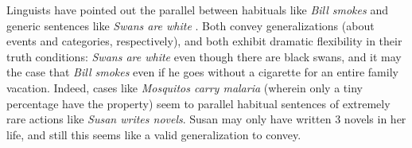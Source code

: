 \documentclass[10pt,letterpaper]{article}
\newcommand{\ndg}[1]{\textcolor{Green}{[ndg: #1]}}
\begin{document}


Linguists have pointed out the parallel between habituals like \emph{Bill smokes} and generic sentences like \emph{Swans are white} \cite{Carlson1977, Carlson2005, Cohen1999}.
Both convey generalizations (about events and categories, respectively), and both exhibit dramatic flexibility in their truth conditions: \emph{Swans are white} even though there are black swans, and it may the case that \emph{Bill smokes} even if he goes without a cigarette for an entire family vacation.
Indeed, cases like \emph{Mosquitos carry malaria} (wherein only a tiny percentage have the property) seem to parallel habitual sentences of extremely rare actions like \emph{Susan writes novels}. Susan may only have written 3 novels in her life, and
 still this seems like a valid generalization to convey.



%
\end{document}
